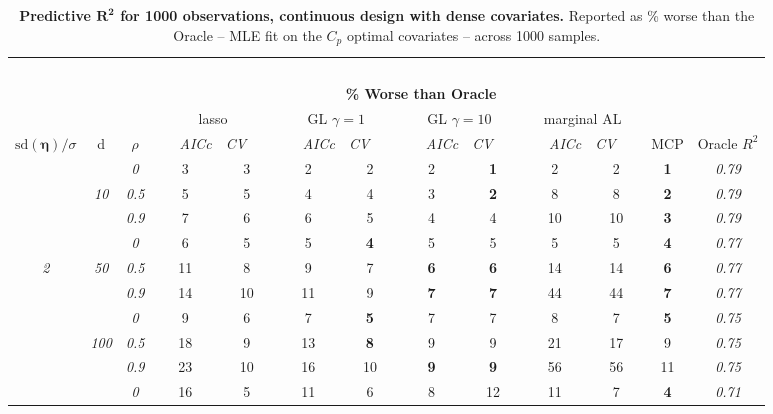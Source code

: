 \clearpage
\begin{table}
\vspace{-.2cm}
\footnotesize
\caption{ 
	{\bf  Predictive $\boldsymbol{R^2}$ for 1000 observations, 
	continuous design with dense covariates.}
  Reported as  \% worse than the Oracle 
  -- MLE fit on the $C_p$ optimal covariates -- 
  across 1000 samples.}
\begin{center}
\begin{tabular}{ccc|cc|cc|cc|cc|c|c}
\hline &&&\multicolumn{9}{|c|}{~}\\[-1ex]
\multicolumn{3}{c}{~}&\multicolumn{9}{|c|}{\bf \% Worse than Oracle } &   \\[1ex]
& &
& \multicolumn{2}{c}{lasso} 
& \multicolumn{2}{c}{GL $\gamma=1$} 
& \multicolumn{2}{c}{GL $\gamma=10$} 
& \multicolumn{2}{c}{marginal AL} 
& \multicolumn{1}{c|}{~} & \\[-0.5ex]
$\mathrm{sd}(\boldsymbol{\eta})/\sigma$ & {\sf d} & $\rho$ 
& ~~~\scriptsize\it AICc & \multicolumn{1}{c}{\scriptsize\it CV~~~}
& ~~~\scriptsize\it AICc & \multicolumn{1}{c}{\scriptsize\it CV~~~}
& ~~~\scriptsize\it AICc & \multicolumn{1}{c}{\scriptsize\it CV~~~}
& ~~~\scriptsize\it AICc & \multicolumn{1}{c}{\scriptsize\it CV~~~} 
& \multicolumn{1}{c|}{ MCP} & Oracle $R^2$ \\[.5ex]
\hline\rule{0pt}{3ex}
& & \it  0  & 3 & 3 & 2 & 2 & 2 & {\bf 1} & 2 & 2 & {\bf 1} & \it  0.79 \\
 & \it  10  & \it  0.5  & 5 & 5 & 4 & 4 & 3 & {\bf 2} & 8 & 8 & {\bf 2} & \it  0.79 \\
& & \it  0.9  & 7 & 6 & 6 & 5 & 4 & 4 & 10 & 10 & {\bf 3} & \it  0.79 \\[1ex]
\cline{2-3}\rule{0pt}{3ex}
& & \it  0  & 6 & 5 & 5 & {\bf 4} & 5 & 5 & 5 & 5 & {\bf 4} & \it  0.77 \\
\it  2  & \it  50  & \it  0.5  & 11 & 8 & 9 & 7 & {\bf 6} & {\bf 6} & 14 & 14 & {\bf 6} & \it  0.77 \\
& & \it  0.9  & 14 & 10 & 11 & 9 & {\bf 7} & {\bf 7} & 44 & 44 & {\bf 7} & \it  0.77 \\[1ex]
\cline{2-3}\rule{0pt}{3ex}
& & \it  0  & 9 & 6 & 7 & {\bf 5} & 7 & 7 & 8 & 7 & {\bf 5} & \it  0.75 \\
 & \it  100  & \it  0.5  & 18 & 9 & 13 & {\bf 8} & 9 & 9 & 21 & 17 & 9 & \it  0.75 \\
& & \it  0.9  & 23 & 10 & 16 & 10 & {\bf 9} & {\bf 9} & 56 & 56 & 11 & \it  0.75 \\[1ex]
\cline{2-3}\rule{0pt}{3ex}
& & \it  0  & 16 & 5 & 11 & 6 & 8 & 12 & 11 & 7 & {\bf 4} & \it  0.71 \\

\end{tabular}
\end{center}
\end{table}
